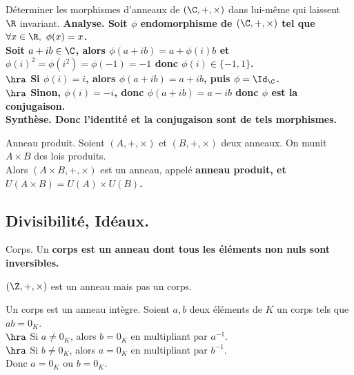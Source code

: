 \documentclass[11pt]{article}
\begin{document}
\vspace*{-0.8cm}

\begin{ex}{}{}
    Déterminer les morphismes d'anneaux de $(\C,+,\times)$ dans lui-même qui laissent $\R$ invariant.
    \tcblower
    \bf{Analyse.} Soit $\phi$ endomorphisme de $(\C,+,\times)$ tel que $\forall x \in \R, ~ \phi(x)=x$.\\
    Soit $a+ib\in\C$, alors $\phi(a+ib)=a+\phi(i)b$ et $\phi(i)^2=\phi(i^2)=\phi(-1)=-1$ donc $\phi(i)\in\{-1,1\}$.\\
    $\hra$ Si $\phi(i)=i$, alors $\phi(a+ib)=a+ib$, puis $\phi=\Id_\C$.\\
    $\hra$ Sinon, $\phi(i)=-i$, donc $\phi(a+ib)=a-ib$ donc $\phi$ est la conjugaison.\\
    \bf{Synthèse.} Donc l'identité et la conjugaison sont de tels morphismes.
\end{ex}

\vspace*{-0.8cm}

\begin{defi}{Anneau produit.}{}
    Soient $(A,+,\times)$ et $(B,+,\times)$ deux anneaux. On munit $A\times B$ des lois produits.\\
    Alors $(A\times B, +, \times)$ est un anneau, appelé \bf{anneau produit}, et $U(A\times B)=U(A)\times U(B)$.
\end{defi}

\vspace*{-1cm}

\subsection{Divisibilité, Idéaux.}

\begin{defi}{Corps.}{}
    Un \bf{corps} est un anneau dont tous les éléments non nuls sont inversibles.
\end{defi}

\vspace*{-0.8cm}

\begin{ex}{}{}
    $(\Z,+,\times)$ est un anneau mais pas un corps.
\end{ex}

\vspace*{-0.8cm}

\begin{prop}{}{}
    Un corps est un anneau intègre.
    \tcblower
    Soient $a,b$ deux éléments de $K$ un corps tels que $ab=0_K$.\\
    $\hra$ Si $a\neq0_K$, alors $b=0_K$ en multipliant par $a^{-1}$.\\
    $\hra$ Si $b\neq0_K$, alors $a=0_K$ en multipliant par $b^{-1}$.\\
    Donc $a=0_K$ ou $b=0_K$.
\end{prop}
\end{document}
